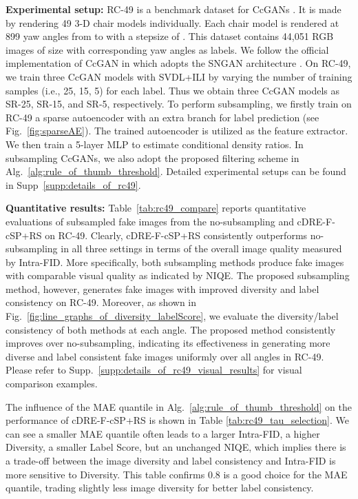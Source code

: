 \documentclass[10pt, twocolumn]{article}
\theoremstyle{definition}
\begin{document}
{\setlength{\parindent}{0cm}\textbf{Experimental setup:}} RC-49 is a benchmark dataset for CcGANs \cite{ding2021ccgan,ding2020continuous}. It is made by rendering 49 3-D chair models individually. Each chair model is rendered at 899 yaw angles from  to  with a stepsize of . This dataset contains 44,051 RGB images of size  with corresponding yaw angles as labels. We follow the official implementation of CcGAN in \cite{ding2020continuous} which adopts the SNGAN architecture \cite{miyato2018spectral}. On RC-49, we train three CcGAN models with SVDL+ILI by varying the number of training samples (i.e., 25, 15, 5) for each label. Thus we obtain three CcGAN models as SR-25, SR-15, and SR-5, respectively. To perform subsampling, we firstly train on RC-49 a sparse autoencoder with an extra branch for label prediction (see Fig.~\ref{fig:sparseAE}). The trained autoencoder is utilized as the feature extractor. We then train a 5-layer MLP to estimate conditional density ratios. In subsampling CcGANs, we also adopt the proposed filtering scheme in Alg.~\ref{alg:rule_of_thumb_threshold}. Detailed experimental setups can be found in Supp\ \ref{supp:details_of_rc49}.          


{\setlength{\parindent}{0cm}\textbf{Quantitative results:}} Table~\ref{tab:rc49_compare} reports quantitative evaluations of subsampled fake images from the no-subsampling and cDRE-F-cSP+RS on RC-49. Clearly, cDRE-F-cSP+RS consistently outperforms no-subsampling in all three settings in terms of the overall image quality measured by Intra-FID. More specifically, both subsampling methods produce fake images with comparable visual quality as indicated by NIQE. The proposed subsampling method, however, generates fake images with improved diversity and label consistency on RC-49. Moreover, as shown in Fig.~\ref{fig:line_graphs_of_diversity_labelScore}, we evaluate the diversity/label consistency of both methods at each angle. The proposed method consistently improves over no-subsampling, indicating its effectiveness in generating more diverse and label consistent fake images uniformly over all angles in RC-49. Please refer to Supp.\ \ref{supp:details_of_rc49_visual_results} for visual comparison examples. 

The influence of the MAE quantile in Alg.\ \ref{alg:rule_of_thumb_threshold} on the performance of cDRE-F-cSP+RS is shown in Table \ref{tab:rc49_tau_selection}. We can see a smaller MAE quantile often leads to a larger Intra-FID, a higher Diversity, a smaller Label Score, but an unchanged NIQE, which implies there is a trade-off between the image diversity and label consistency and Intra-FID is more sensitive to Diversity. This table confirms 0.8 is a good choice for the MAE quantile, trading slightly less image diversity for better label consistency. 
\end{document}
